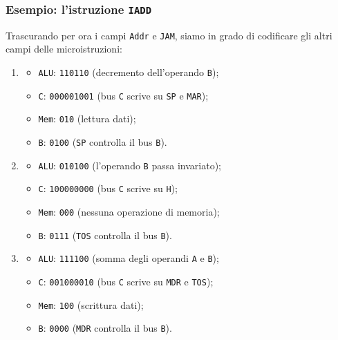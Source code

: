 \documentclass{beamer}
\begin{document}
\begin{frame}
  \frametitle{Esempio: l'istruzione \lstinline{IADD}}
  Trascurando per ora i campi \lstinline{Addr} e \lstinline{JAM}, siamo in grado
di codificare gli altri campi delle microistruzioni:
\begin{enumerate}
  \item
  \begin{itemize}
    \item \lstinline{ALU}: \lstinline{110110} (decremento dell'operando \lstinline{B});
    \item \lstinline{C}: \lstinline{000001001} (bus \lstinline{C} scrive su
    \lstinline{SP} e \lstinline{MAR});
    \item \lstinline{Mem}: \lstinline{010} (lettura dati);
    \item \lstinline{B}: \lstinline{0100} (\lstinline{SP} controlla il bus \lstinline{B}).
  \end{itemize}
  \item
  \begin{itemize}
    \item \lstinline{ALU}: \lstinline{010100} (l'operando \lstinline{B} passa invariato);
    \item \lstinline{C}: \lstinline{100000000} (bus \lstinline{C} scrive su
    \lstinline{H});
    \item \lstinline{Mem}: \lstinline{000} (nessuna operazione di memoria);
    \item \lstinline{B}: \lstinline{0111} (\lstinline{TOS} controlla il bus \lstinline{B}).
  \end{itemize}
  \item
  \begin{itemize}
    \item \lstinline{ALU}: \lstinline{111100} (somma degli operandi
    \lstinline{A} e \lstinline{B});
    \item \lstinline{C}: \lstinline{001000010} (bus \lstinline{C} scrive su
    \lstinline{MDR} e \lstinline{TOS});
    \item \lstinline{Mem}: \lstinline{100} (scrittura dati);
    \item \lstinline{B}: \lstinline{0000} (\lstinline{MDR} controlla il bus \lstinline{B}).
  \end{itemize}
\end{enumerate}
\end{frame}
\end{document}
